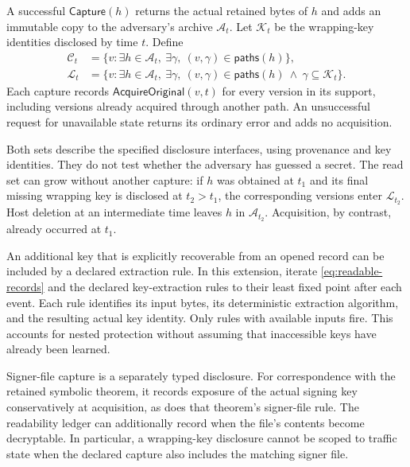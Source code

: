 \begin{definition}
\label{def:record-acquisition}
A successful $\mathsf{Capture}(h)$ returns the actual retained bytes of $h$
and adds an immutable copy to the adversary's archive $\mathcal A_t$.
Let $\mathcal K_t$ be the wrapping-key identities disclosed by time $t$.
Define
\begin{align}
  \mathcal C_t
    &=\{v:\exists h\in\mathcal A_t,\ \exists\gamma,\
                    (v,\gamma)\in\mathsf{paths}(h)\}, \label{eq:acquired-records}\\
  \mathcal L_t
    &=\{v:\exists h\in\mathcal A_t,\ \exists\gamma,\
          (v,\gamma)\in\mathsf{paths}(h)
          \ \wedge\ \gamma\subseteq\mathcal K_t\}.
          \label{eq:readable-records}
\end{align}
Each capture records $\mathsf{AcquireOriginal}(v,t)$ for every version in its
support, including versions already acquired through another path.
An unsuccessful request for unavailable state returns its ordinary error and
adds no acquisition.
\end{definition}

Both sets describe the specified disclosure interfaces, using provenance and
key identities.  They do not test whether the adversary has guessed a secret.
The read set can grow without another capture: if $h$ was obtained at
$t_1$ and its final missing wrapping key is disclosed at $t_2>t_1$, the
corresponding versions enter $\mathcal L_{t_2}$.  Host deletion at an
intermediate time leaves $h$ in $\mathcal A_{t_2}$.  Acquisition, by contrast,
already occurred at $t_1$.

An additional key that is explicitly recoverable from an opened record can be
included by a declared extraction rule.  In this extension, iterate
\eqref{eq:readable-records} and the declared key-extraction rules to their least
fixed point after each event.  Each rule identifies its input bytes, its
deterministic extraction algorithm, and the resulting actual key identity.
Only rules with available inputs fire.  This accounts for nested protection
without assuming that inaccessible keys have already been learned.

Signer-file capture is a separately typed disclosure.  For correspondence
with the retained symbolic theorem, it records exposure of the actual signing
key conservatively at acquisition, as does that theorem's signer-file rule.
The readability ledger can additionally record when the file's contents
become decryptable.  In particular, a wrapping-key disclosure cannot be
scoped to traffic state when the declared capture also includes the matching
signer file.


